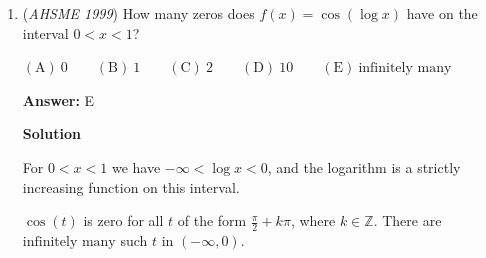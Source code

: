 \begin{enumerate}
\textbf{Solution 1}

According to the problem statement, there are polynomials $Q(x)$ and $R(x)$ such that $P(x) = Q(x)(x-19) + 99 = R(x)(x-99) + 19$.

 From the last equality we get $Q(x)(x-19) + 80 = R(x)(x-99)$.

 The value $x=99$ is a root of the polynomial on the right hand side, therefore it must be a root of the one on the left hand side as well. Substituting, we get $Q(99)(99-19) + 80 = 0$, from which $Q(99)=-1$. This means that $99$ is a root of the polynomial $Q(x)+1$. In other words, there is a polynomial $S(x)$ such that $Q(x)+1 = S(x)(x-99)$.

 Substituting this into the original formula for $P(x)$ we get 
 \[P(x) = Q(x)(x-19) + 99 = (S(x)(x-99) - 1)(x-19) + 99 =\]
 \[= S(x)(x-99)(x-19) - (x-19) + 99\]

 Therefore when $P(x)$ is divided by $(x-19)(x-99)$, the remainder is $\boxed{-x + 118}$.

 



\textbf{Solution 2}

Since the divisor $(x-19)(x-99)$ is a quadratic, the degree of the remainder is at most linear. We can write $P(x)$ in the form
 \[P(x) = Q(x)(x-19)(x-99) + cx+d\] where $cx+d$ is the remainder.By the Remainder Theorem, plugging in $19$ and $99$ gives us a system of equations.
 \[99c+d = 19\]
 \[19c+d = 99\]

 Solving gives us $c=-1$ and $d = 118$, thus, our answer is $\boxed{ \mathrm{(C) \ }-x+118}$



	\item (\textit{AHSME 1999}) How many zeros does $f(x) = \cos(\log x)$ have on the interval $0 < x < 1$?


 $\mathrm{(A) \ } 0 \qquad \mathrm{(B) \ } 1 \qquad \mathrm{(C) \ } 2 \qquad \mathrm{(D) \ } 10 \qquad \mathrm{(E) \ } \text{infinitely\ many}$

 \textbf{Answer: }E



\textbf{Solution}

For $0 < x < 1$ we have $-\infty < \log x < 0$, and the logarithm is a strictly increasing function on this interval.

 $\cos(t)$ is zero for all $t$ of the form $\frac{\pi}2 + k\pi$, where $k\in\mathbb{Z}$. There are $\boxed{\text{infinitely\ many}}$ such $t$ in $(-\infty,0)$.


\end{enumerate}
